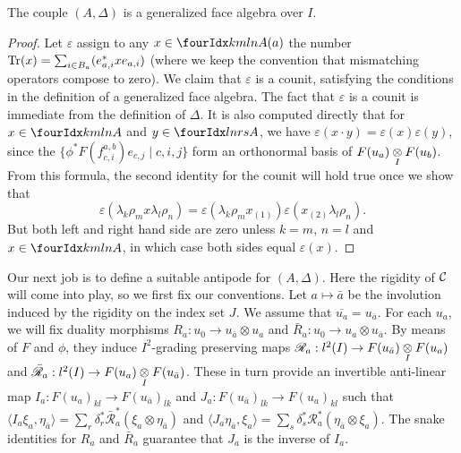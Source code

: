 
\begin{Prop} The couple $(A,\Delta)$ is a generalized face algebra over $I$.
\end{Prop}
\begin{proof} Let $\varepsilon$ assign to any $x\in \Gr{A}{k}{l}{m}{n}(a)$ the number $\mathrm{Tr}(x) = \sum_{i\in B_a} (e_{a,i}^*xe_{a,i})$ (where we keep the convention that mismatching operators compose to zero). We claim that $\varepsilon$ is a counit, satisfying the conditions in the definition of a generalized face algebra. The fact that $\varepsilon$ is a counit is immediate from the definition of $\Delta$. It is also computed directly that for $x\in \Gr{A}{k}{l}{m}{n}$ and $y\in \Gr{A}{l}{r}{n}{s}$, we have $\varepsilon(x\cdot y) = \varepsilon(x)\varepsilon(y)$, since the $\{\phi^*F(f_{c,i}^{a,b})e_{c,j}\mid c,i,j\}$ form an orthonormal basis of $F(u_a)\underset{I}{\otimes} F(u_b)$. From this formula, the second identity for the counit will hold true once we show that \[\varepsilon(\lambda_k\rho_mx\lambda_l\rho_n) = \varepsilon(\lambda_k\rho_mx_{(1)})\varepsilon(x_{(2)}\lambda_l\rho_n).\] But both left and right hand side are zero unless $k=m$, $n=l$ and $x\in \Gr{A}{k}{l}{m}{n}$, in which case both sides equal $\varepsilon(x)$.
\end{proof}

Our next job is to define a suitable antipode for $(A,\Delta)$. Here the rigidity of $\mathcal{C}$ will come into play, so we first fix our conventions. Let $a \mapsto \bar{a}$ be the involution induced by the rigidity on the index set $J$. We assume that $\overline{u_a} = u_{\bar{a}}$. For each $u_a$, we will fix duality morphisms $R_a: u_0\rightarrow u_{\bar{a}}\otimes u_a$ and $\bar{R}_a: u_0\rightarrow u_a\otimes u_{\bar{a}}$. By means of $F$ and $\phi$, they induce $I^2$-grading preserving maps $\mathscr{R}_a: l^2(I) \rightarrow F(u_{\bar{a}})\underset{I}{\otimes} F(u_a)$ and $\bar{\mathscr{R}}_a:l^2(I) \rightarrow F(u_a)\underset{I}{\otimes} F(u_{\bar{a}})$. These in turn provide an invertible anti-linear map $I_a:F(u_a)_{kl}\rightarrow F(u_{\bar{a}})_{lk}$ and $J_a: F(u_{\bar{a}})_{lk}\rightarrow F(u_{a})_{kl}$ such that $\langle I_{a}\xi_a,\eta_{\bar{a}}\rangle = \sum_r\delta_r^* \bar{\mathscr{R}}_a^*(\xi_a\otimes \eta_{\bar{a}})$ and $\langle J_a\eta_{\bar{a}},\xi_a\rangle = \sum_s \delta_s^* \mathscr{R}_a^* (\eta_{\bar{a}}\otimes \xi_a)$. The snake identities for $R_a$ and $\bar{R}_a$ guarantee that $J_a$ is the inverse of $I_a$.

